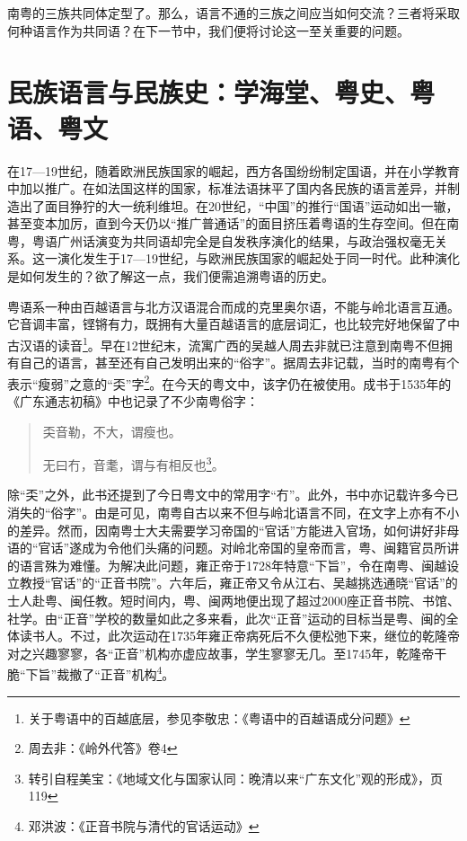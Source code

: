 南粤的三族共同体定型了。那么，语言不通的三族之间应当如何交流？三者将采取何种语言作为共同语？在下一节中，我们便将讨论这一至关重要的问题。

\section{民族语言与民族史：学海堂、粤史、粤语、粤文}

\indent 在17—19世纪，随着欧洲民族国家的崛起，西方各国纷纷制定国语，并在小学教育中加以推广。在如法国这样的国家，标准法语抹平了国内各民族的语言差异，并制造出了面目狰狞的大一统利维坦。在20世纪，“中国”的推行“国语”运动如出一辙，甚至变本加厉，直到今天仍以“推广普通话”的面目挤压着粤语的生存空间。但在南粤，粤语广州话演变为共同语却完全是自发秩序演化的结果，与政治强权毫无关系。这一演化发生于17—19世纪，与欧洲民族国家的崛起处于同一时代。此种演化是如何发生的？欲了解这一点，我们便需追溯粤语的历史。

粤语系一种由百越语言与北方汉语混合而成的克里奥尔语，不能与岭北语言互通。它音调丰富，铿锵有力，既拥有大量百越语言的底层词汇，也比较完好地保留了中古汉语的读音\footnote{关于粤语中的百越底层，参见李敬忠：《粤语中的百越语成分问题》}。早在12世纪末，流寓广西的吴越人周去非就已注意到南粤不但拥有自己的语言，甚至还有自己发明出来的“俗字”。据周去非记载，当时的南粤有个表示“瘦弱”之意的“奀”字\footnote{周去非：《岭外代答》卷4}。在今天的粤文中，该字仍在被使用。成书于1535年的《广东通志初稿》中也记录了不少南粤俗字：

\begin{quote}
奀音勒，不大，谓瘦也。

无曰冇，音耄，谓与有相反也\footnote{转引自程美宝：《地域文化与国家认同：晚清以来“广东文化”观的形成》，页119}。
\end{quote}

除“奀”之外，此书还提到了今日粤文中的常用字“冇”。此外，书中亦记载许多今已消失的“俗字”。由是可见，南粤自古以来不但与岭北语言不同，在文字上亦有不小的差异。然而，因南粤士大夫需要学习帝国的“官话”方能进入官场，如何讲好非母语的“官话”遂成为令他们头痛的问题。对岭北帝国的皇帝而言，粤、闽籍官员所讲的语言殊为难懂。为解决此问题，雍正帝于1728年特意“下旨”，令在南粤、闽越设立教授“官话”的“正音书院”。六年后，雍正帝又令从江右、吴越挑选通晓“官话”的士人赴粤、闽任教。短时间内，粤、闽两地便出现了超过2000座正音书院、书馆、社学。由“正音”学校的数量如此之多来看，此次“正音”运动的目标当是粤、闽的全体读书人。不过，此次运动在1735年雍正帝病死后不久便松弛下来，继位的乾隆帝对之兴趣寥寥，各“正音”机构亦虚应故事，学生寥寥无几。至1745年，乾隆帝干脆“下旨”裁撤了“正音”机构\footnote{邓洪波：《正音书院与清代的官话运动》}。

